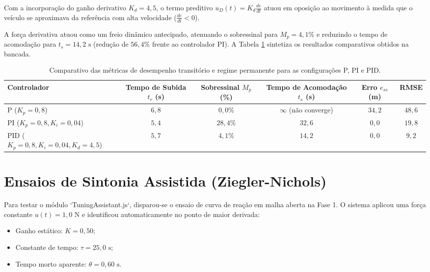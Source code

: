 Com a incorporação do ganho derivativo $K_d = 4{,}5$, o termo preditivo $u_D(t) = K_d \frac{de}{dt}$ atuou em oposição ao movimento à medida que o veículo se aproximava da referência com alta velocidade ($\frac{de}{dt} < 0$). 

A força derivativa atuou como um freio dinâmico antecipado, atenuando o sobressinal para $M_p = 4{,}1\%$ e reduzindo o tempo de acomodação para $t_s = 14{,}2\text{ s}$ (redução de $56{,}4\%$ frente ao controlador PI). A Tabela \ref{tab:comparativo_pid} sintetiza os resultados comparativos obtidos na bancada.

\begin{table}[htbp]
    \centering
    \caption{Comparativo das métricas de desempenho transitório e regime permanente para as configurações P, PI e PID.}
    \label{tab:comparativo_pid}
    \begin{tabular}{l|c|c|c|c|c}
        \hline
        \textbf{Controlador} & \textbf{Tempo de Subida $t_r$ (s)} & \textbf{Sobressinal $M_p$ (\%)} & \textbf{Tempo de Acomodação $t_s$ (s)} & \textbf{Erro $e_{ss}$ (m)} & \textbf{RMSE} \\
        \hline
        P ($K_p = 0{,}8$)          & $6{,}8$ & $0{,}0\%$  & $\infty$ (não converge) & $34{,}2$ & $48{,}6$ \\
        PI ($K_p=0{,}8, K_i=0{,}04$) & $5{,}4$ & $28{,}4\%$ & $32{,}6$                & $0{,}0$  & $19{,}8$ \\
        PID ($K_p=0{,}8, K_i=0{,}04, K_d=4{,}5$) & $5{,}7$ & $4{,}1\%$  & $14{,}2$    & $0{,}0$  & $9{,}2$ \\
        \hline
    \end{tabular}
    \vspace{0.1cm}
\end{table}

\section{Ensaios de Sintonia Assistida (Ziegler-Nichols)}
\label{sec:ensaios_sintonia}

Para testar o módulo `TuningAssistant.js`, disparou-se o ensaio de curva de reação em malha aberta na Fase 1. O sistema aplicou uma força constante $u(t) = 1{,}0\text{ N}$ e identificou automaticamente no ponto de maior derivada:

\begin{itemize}
    \item Ganho estático: $K = 0{,}50$;
    \item Constante de tempo: $\tau = 25{,}0\text{ s}$;
    \item Tempo morto aparente: $\theta = 0{,}60\text{ s}$.
\end{itemize}

